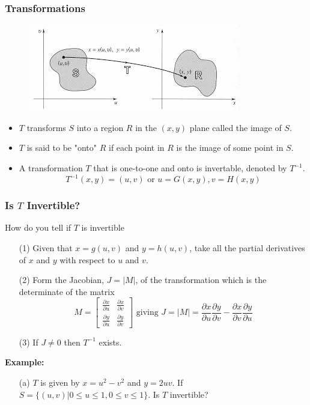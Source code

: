 \documentclass{beamer}
\begin{document}
\begin{frame}
\frametitle{Transformations}
\begin{figure}
	\includegraphics[width=.8\textheight]{vmap.jpg}\\
	\hspace*{10pt}\hbox{}
\end{figure}

\begin{itemize}
	\item $T$ transforms $S$ into a region $R$ in the $(x,y)$ plane called the image of $S$.
	\item $T$ is said to be "onto" $R$ if each point in $R$ is the image of some point in $S$.
	\item A transformation $T$ that is one-to-one and onto is invertable, denoted by $T^{-1}$.
	$$T^{-1}(x,y) = (u,v) \mbox { or } u = G(x,y), v=H(x,y)$$
\end{itemize}
\end{frame}

\begin{frame}
\frametitle{Is $T$ Invertible?}
How do you tell if $T$ is invertible 
\begin{itemize}
	\item[(1)] Given that $x = g(u,v)$ and $y=h(u,v)$, take all the partial derivatives of $x$ and $y$ with respect to $u$ and $v$.
	\item[(2)] Form the Jacobian, $J = |M|$, of the transformation which is the determinate of the matrix
	$$M = \begin{bmatrix}
		\frac{\partial x}{\partial u} & 	\frac{\partial x}{\partial v}\\
			\frac{\partial y}{\partial u} & 	\frac{\partial y}{\partial v}
	\end{bmatrix} \mbox{ giving } J=|M| = \frac{\partial x}{\partial u} \frac{\partial y}{\partial v}-	\frac{\partial x}{\partial v}\frac{\partial y}{\partial u} $$
	\item[(3)] If $J \neq 0$ then $T^{-1}$ exists.
\end{itemize}
\textbf{Example:}
\begin{itemize}
	\item[(a)] $T$ is given by $x=u^2-v^2$ and $y=2uv$. If $S = \{ (u,v)| 0\leq u \leq 1, 0\leq v\leq1\}$. Is $T$ invertible?
\end{itemize}
\end{frame}
\end{document}
